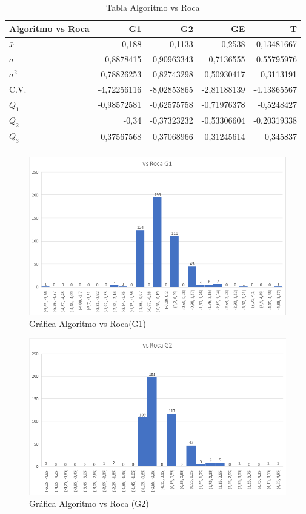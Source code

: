 \begin{longtable}[c]{lrrrr}
\hline
Algoritmo vs Roca & G1 & G2 & GE & T \\ \hline
$\bar{x}$ & -0,188 & -0,1133 & -0,2538 & -0,13481667 \\ 
$\sigma$ & 0,8878415 & 0,90963343 & 0,7136555 & 0,55795976 \\
$\sigma^2$& 0,78826253 & 0,82743298 & 0,50930417 & 0,3113191 \\
C.V. & -4,72256116 & -8,02853865 & -2,81188139 & -4,13865567 \\ 
$Q_1$ & -0,98572581 & -0,62575758 & -0,71976378 & -0,5248427 \\ 
$Q_2$ & -0,34 & -0,37323232 & -0,53306604 & -0,20319338 \\ 
$Q_3$ & 0,37567568 & 0,37068966 & 0,31245614 & 0,345837 \\ \hline
\caption{Tabla Algoritmo vs Roca}
\label{tab:AvR}
\end{longtable}



\begin{figure}[h]
\centering
\includegraphics[width=.6\textwidth]{figuras/AvRG1.png}   
\caption{Gráfica Algoritmo vs Roca(G1)}
\label{fig:AvRG1}
\end{figure}

\begin{figure}[h]
\centering
\includegraphics[width=.6\textwidth]{figuras/AvRG2.png}   
\caption{Gráfica Algoritmo vs Roca (G2)}
\label{fig:AvRG2}
\end{figure}


